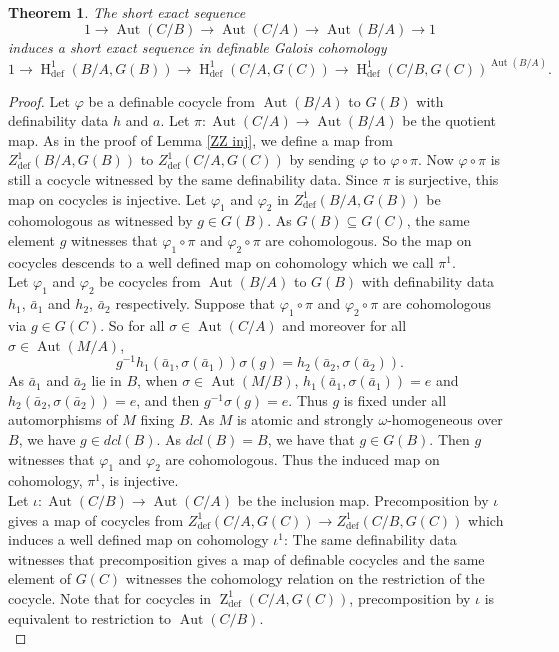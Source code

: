 \documentclass{article}
\theoremstyle{problemstyle}
\newtheorem{theorem}[problem]{Theorem}
\DeclareMathOperator{\defin}{def} %
\DeclareMathOperator{\aut}{Aut} %
\DeclareMathOperator{\HH}{H} %
\DeclareMathOperator{\ZZ}{Z} %
\begin{document}
\begin{theorem}
    The short exact sequence $$1 \to \aut(C/B) \to \aut(C/A) \to \aut(B/A) \to 1$$ induces a short exact sequence in definable Galois cohomology $$1 \to \HH^1_{\defin}(B/A,G(B)) \to \HH^1_{\defin}(C/A,G(C)) \to \HH^1_{\defin}(C/B,G(C))^{\aut(B/A)}.$$
\end{theorem}

\begin{proof}
Let $\varphi$ be a definable cocycle from $\aut(B/A)$ to $G(B)$ with definability data $h$ and $a$. Let $\pi:\aut(C/A) \to \aut(B/A)$ be the quotient map. As in the proof of Lemma \ref{ZZ inj}, we define a map from $Z^1_{\defin}(B/A,G(B))$ to $Z^1_{\defin}(C/A,G(C))$ by sending $\varphi$ to $\varphi \circ \pi$. Now $\varphi \circ \pi$ is still a cocycle witnessed by the same definability data. Since $\pi$ is surjective, this map on cocycles is injective. Let $\varphi_1$ and $\varphi_2$ in  $Z^1_{\defin}(B/A,G(B))$ be cohomologous as witnessed by $g \in G(B)$. As $G(B) \subseteq G(C)$, the same element $g$ witnesses that $\varphi_1 \circ \pi$ and $\varphi_2 \circ \pi$ are cohomologous. So the map on cocycles descends to a well defined map on cohomology which we call $\pi^1$.\\

Let $\varphi_1$ and $\varphi_2$ be cocycles from $\aut(B/A)$ to $G(B)$ with definability data $h_1$, $\bar{a}_1$ and $h_2$, $\bar{a}_2$ respectively. Suppose that $\varphi_1 \circ \pi$ and $\varphi_2\circ\pi$ are cohomologous via $g \in G(C)$. So for all $\sigma \in \aut(C/A)$ and moreover for all $\sigma \in \aut(M/A)$, $$g^{-1}h_1(\bar{a}_1,\sigma(\bar{a}_1))\sigma(g) = h_2(\bar{a}_2,\sigma(\bar{a}_2)).$$ As $\bar{a}_1$ and $\bar{a}_2$ lie in $B$, when $\sigma \in \aut(M/B)$, $h_1(\bar{a}_1,\sigma(\bar{a}_1)) = e$ and $h_2(\bar{a}_2,\sigma(\bar{a}_2)) = e$, and then $g^{-1}\sigma(g) = e$. Thus $g$ is fixed under all automorphisms of $M$ fixing $B$. As $M$ is atomic and strongly $\omega$-homogeneous over $B$, we have $g \in dcl(B)$. As $dcl(B) = B$, we have that $g \in G(B)$. Then $g$ witnesses that $\varphi_1$ and $\varphi_2$ are cohomologous. Thus the induced map on cohomology, $\pi^1$, is injective.\\

Let $\iota:\aut(C/B) \to \aut(C/A)$ be the inclusion map. Precomposition by $\iota$ gives a map of cocycles from $Z^1_{\defin}(C/A,G(C)) \to Z^1_{\defin}(C/B,G(C))$ which induces a well defined map on cohomology $\iota^1$: The same definability data witnesses that precomposition gives a map of definable cocycles and the same element of $G(C)$ witnesses the cohomology relation on the restriction of the cocycle. Note that for cocycles in $\ZZ^1_{\defin}(C/A,G(C))$, precomposition by $\iota$ is equivalent to restriction to $\aut(C/B)$.  \\


\end{proof}
\end{document}
